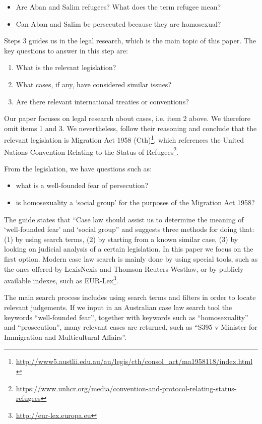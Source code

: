 \begin{itemize}
\item Are Aban and Salim refugees? What does the term refugee mean?
\item Can Aban and Salim be persecuted because they are homosexual?
\end{itemize}

Steps 3 guides us in the legal research, which is the main topic of this paper. The key questions to answer in this step are:

\begin{enumerate}
\item What is the relevant legislation? 
\item What cases, if any, have considered similar issues? 
\item Are there relevant international treaties or conventions?
\end{enumerate}

Our paper focuses on legal research about cases, i.e. item 2 above. We therefore omit items 1 and 3. We nevertheless, follow their reasoning and conclude that the relevant legislation is Migration Act 1958 (Cth)\footnote{\url{http://www5.austlii.edu.au/au/legis/cth/consol_act/ma1958118/index.html}}, which references the United Nations Convention Relating to the Status of Refugees\footnote{\url{https://www.unhcr.org/media/convention-and-protocol-relating-status-refugees}}.

From the legislation, we have questions such as:
\begin{itemize}
\item what is a well-founded fear of persecution?
\item is homosexuality a ‘social group’ for the purposes of the Migration Act 1958?
\end{itemize}

The guide states that ``Case law should assist us to determine the meaning of ‘well-founded fear’ and ‘social group'' \cite{sanderson2021practical} and suggests three methods for doing that: (1) by using search terms, (2) by starting from a known similar case, (3) by looking on judicial analysis of a certain legislation. In this paper we focus on the first option.
Modern case law search is mainly done by using special tools, such as the ones offered by LexisNexis and Thomson Reuters Westlaw, or by publicly available indexes, such as EUR-Lex\footnote{\url{http://eur-lex.europa.eu}}.

The main search process includes using search terms and filters in order to locate relevant judgements. If we input in an Australian case law search tool the keywords ``well-founded fear'', together with keywords such as ``homosexuality'' and ``prosecution'', many relevant cases are returned, such as ``S395 v Minister for Immigration and Multicultural Affairs''. 

